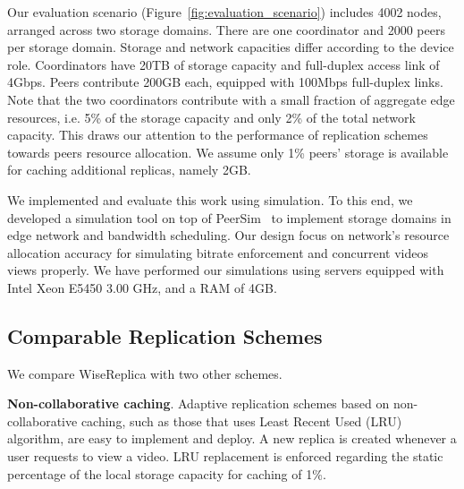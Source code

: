 Our evaluation scenario (Figure~\ref{fig:evaluation_scenario}) includes 4002 nodes, arranged across two storage domains. There are one coordinator and 2000 peers per storage domain. Storage and network capacities differ according to the device role. Coordinators have 20TB of storage capacity and full-duplex access link of 4Gbps. Peers contribute 200GB each, equipped with 100Mbps full-duplex links. Note that the two coordinators contribute with a small fraction of aggregate edge resources, i.e. 5\% of the storage capacity and only 2\% of the total network capacity. This draws our attention to the performance of replication schemes towards peers resource allocation. We assume only 1\% peers' storage is available for caching additional replicas, namely 2GB.

We implemented and evaluate this work using simulation. To this end, we developed a simulation tool on top of PeerSim~\cite{p2p09-peersim} to implement storage domains in edge network and bandwidth scheduling. Our design focus on network's resource allocation accuracy for simulating bitrate enforcement and concurrent videos views properly. We have performed our simulations using servers equipped with Intel Xeon E5450 3.00 GHz, and a RAM of 4GB. 

\subsection{Comparable Replication Schemes}
\label{subsec:methodology_replication_schemes}

We compare WiseReplica with two other schemes.

\noindent
{\bf Non-collaborative caching}. Adaptive replication schemes based on non-collaborative caching, such as those that uses Least Recent Used (LRU) algorithm, are easy to implement and deploy. A new replica is created whenever a user requests to view a video. LRU replacement is enforced regarding the static percentage of the local storage capacity for caching of 1\%.

